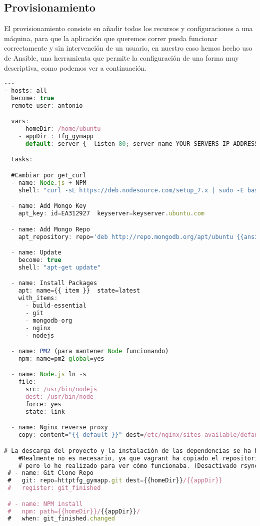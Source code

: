 \subsection {Provisionamiento}
El provisionamiento consiste en añadir todos los recursos y configuraciones a una máquina, para que la aplicación que queremos correr pueda funcionar correctamente y sin intervención de un usuario, en nuestro caso hemos hecho uso de Ansible, una herramienta que permite la configuración de una forma muy descriptiva, como podemos ver a continuación.
\begin{lstlisting}[language=javascript,caption={Test Unitarios},label={lst:appjs}]
---
- hosts: all
  become: true
  remote_user: antonio

  vars:
    - homeDir: /home/ubuntu
    - appDir : tfg_gymapp
    - default: server {  listen 80; server_name YOUR_SERVERS_IP_ADDRESS;  location / { proxy_pass "http://127.0.0.1:80"; proxy_http_version 1.1; proxy_set_header Upgrade $http_upgrade; proxy_set_header Connection 'upgrade'; proxy_cache_bypass $http_upgrade; }}

  tasks:

  #Cambiar por get_curl
  - name: Node.js + NPM
    shell: "curl -sL https://deb.nodesource.com/setup_7.x | sudo -E bash -"

  - name: Add Mongo Key
    apt_key: id=EA312927  keyserver=keyserver.ubuntu.com

  - name: Add Mongo Repo
    apt_repository: repo='deb http://repo.mongodb.org/apt/ubuntu {{ansible_distribution_release}}/mongodb-org/3.2 multiverse'                                     

  - name: Update
    become: true
    shell: "apt-get update"

  - name: Install Packages
    apt: name={{ item }}  state=latest
    with_items:
      - build-essential
      - git
      - mongodb-org
      - nginx  
      - nodejs   

  - name: PM2 (para mantener Node funcionando)
    npm: name=pm2 global=yes 

  - name: Node.js ln -s
    file:
      src: /usr/bin/nodejs
      dest: /usr/bin/node
      force: yes
      state: link

  - name: Nginx reverse proxy
    copy: content="{{ default }}" dest=/etc/nginx/sites-available/default

# La descarga del proyecto y la instalación de las dependencias se ha hecho con Fabric aunque se podría haber hecho aquí
    #Realmente no es necesario, ya que vagrant ha copiado el repositorio
    # pero lo he realizado para ver cómo funcionaba. (Desactivado rsync)
 # - name: Git Clone Repo
 #   git: repo=httptfg_gymapp.git dest={{homeDir}}/{{appDir}} 
 #   register: git_finished

 # - name: NPM install
 #   npm: path={{homeDir}}/{{appDir}}/
 #   when: git_finished.changed
 

\end{lstlisting}

